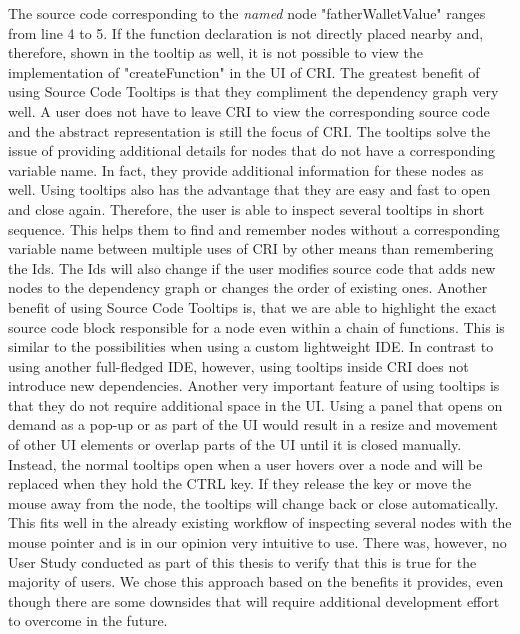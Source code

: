 The source code corresponding to the \emph{named} node "fatherWalletValue" ranges from line 4 to 5. If the function declaration is not directly placed nearby and, therefore, shown in the tooltip as well, it is not possible to view the implementation of "createFunction" in the UI of CRI.
The greatest benefit of using Source Code Tooltips is that they compliment the dependency graph very well. A user does not have to leave CRI to view the corresponding source code and the abstract representation is still the focus of CRI. The tooltips solve the issue of providing additional details for nodes that do not have a corresponding variable name. In fact, they provide additional information for these nodes as well. Using tooltips also has the advantage that they are easy and fast to open and close again. Therefore, the user is able to inspect several tooltips in short sequence. This helps them to find and remember nodes without a corresponding variable name between multiple uses of CRI by other means than remembering the Ids.  The Ids will also change if the user modifies source code that adds new nodes to the dependency graph or changes the order of existing ones. Another benefit of using Source Code Tooltips is, that we are able to highlight the exact source code block responsible for a node even within a chain of functions. This is similar to the possibilities when using a  custom lightweight IDE. In contrast to using another full-fledged IDE, however, using tooltips inside CRI does not introduce new dependencies. Another very important feature of using tooltips is that they do not require additional space in the UI. Using a panel that opens on demand as a pop-up or as part of the UI would result in a resize and movement of other UI elements or overlap parts of the UI until it is closed manually. Instead, the normal tooltips open when a user hovers over a node and will be replaced when they hold the CTRL key. If they release the key or move the mouse away from the node, the tooltips will change back or close automatically. This fits well in the already existing workflow of inspecting several nodes with the mouse pointer and is in our opinion very intuitive to use. There was, however, no User Study conducted as part of this thesis to verify that this is true for the majority of users. We chose this approach based on the benefits it provides, even though there are some downsides that will require additional development effort to overcome in the future.
			
